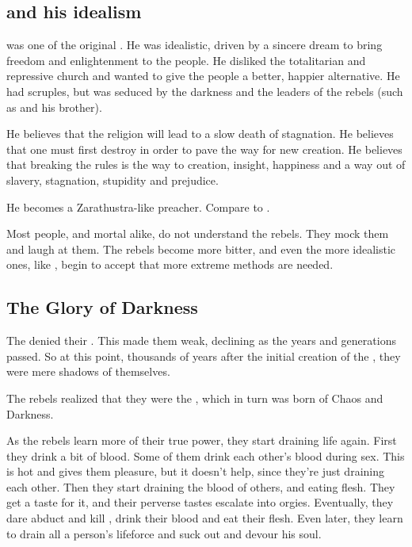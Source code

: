 \subsection{\Sithiyacaan{} and his idealism}
\Sithiyacaan{} was one of the original . He was idealistic, driven by a sincere dream to bring freedom and enlightenment to the \resphan{} people. He disliked the totalitarian and repressive \Merkyran{} church and wanted to give the people a better, happier alternative. He had scruples, but was seduced by the darkness and the leaders of the rebels (such as  and his brother). 

He believes that the \Merkyran{} religion will lead to a slow death of stagnation. 
He believes that one must first destroy in order to pave the way for new creation. 
He believes that breaking the rules is the way to creation, insight, happiness and a way out of slavery, stagnation, stupidity and prejudice.

He becomes a Zarathustra-like preacher. Compare to . 

Most people, \resphan{} and mortal alike, do not understand the rebels. They mock them and laugh at them. The rebels become more bitter, and even the more idealistic ones, like \Sithiyacaan, begin to accept that more extreme methods are needed. 









\subsection{The Glory of Darkness}
The \Merkyrans{} denied their . This made them weak, declining as the years and generations passed. So at this point, thousands of years after the initial creation of the \resphain, they were mere shadows of themselves.

The rebels realized that they were the , which in turn was born of Chaos and Darkness. 

As the rebels learn more of their true power, they start draining life again. First they drink a bit of blood. Some of them drink each other's blood during sex. This is hot and gives them pleasure, but it doesn't help, since they're just draining each other. Then they start draining the blood of others, and eating \human{} flesh. They get a taste for it, and their perverse tastes escalate into orgies. Eventually, they dare abduct and kill \resphain{}, drink their blood and eat their flesh. Even later, they learn to drain all a person's lifeforce and suck out and devour his soul. 

